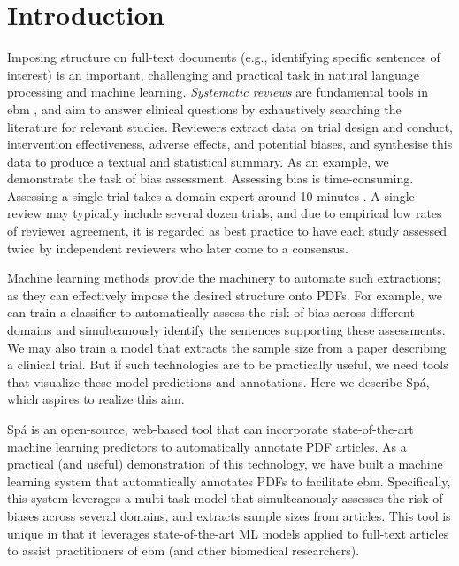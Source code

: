 \documentclass[runningheads,a4paper]{llncs}
\begin{document}
\acresetall

\section{Introduction}
\label{section:intro}

Imposing structure on full-text documents (e.g., identifying specific sentences of interest) is an important, challenging and practical task in natural language processing and machine learning.
\emph{Systematic reviews} are fundamental tools in \ac{ebm} \cite{sackett1996}, and aim to answer clinical questions by exhaustively searching the literature for relevant studies. Reviewers extract data on trial design and conduct, intervention effectiveness, adverse effects, and potential biases, and synthesise this data to produce a textual and statistical summary.
As an example, we demonstrate the task of bias assessment.
Assessing bias is time-consuming.
Assessing a single trial takes a domain expert around 10 minutes \cite{Hartling2011}.
A single review may typically include several dozen trials, and due to empirical low rates of reviewer agreement, it is regarded as best practice to have each study assessed twice by independent reviewers who later come to a consensus\cite{Hartling2009}.


Machine learning methods provide the machinery to automate such extractions; as they can effectively impose the desired structure onto PDFs.
For example, we can train a classifier to automatically assess the risk of bias across different domains and simulteanously identify the sentences supporting these assessments.
We may also train a model that extracts the sample size from a paper describing a clinical trial. 
But if such technologies are to be practically useful, we need tools that visualize these model predictions and annotations.
Here we describe Spá, which aspires to realize this aim.

Spá is an open-source, web-based tool that can incorporate state-of-the-art machine learning predictors to automatically annotate PDF articles.
As a practical (and useful) demonstration of this technology, we have built a machine learning system that automatically annotates PDFs to facilitate \ac{ebm}. 
Specifically, this system leverages a multi-task model that simulteanously assesses the risk of biases across several domains, and extracts sample sizes from articles.
This tool is unique in that it leverages state-of-the-art ML models applied to full-text articles to assist practitioners of \ac{ebm} (and other biomedical researchers). 
 
\end{document}
